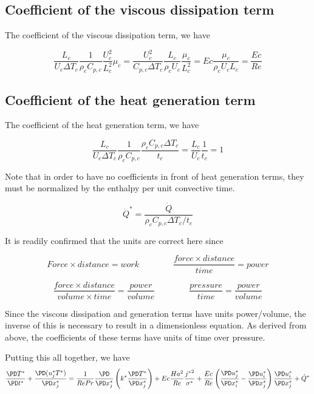 \documentclass[11pt]{article}
\begin{document}
\subsection{Coefficient of the viscous dissipation term}
The coefficient of the viscous dissipation term, we have

\begin{equation}
\frac{L_c}{U_c \Delta T_c} \frac{1}{\rho_c C_{p,c}} \frac{U_c^2}{L_c^2}\mu_c =
\frac{U_c^2}{C_{p,c} \Delta T_c} \frac{L_c}{\rho_c U_c} \frac{\mu_c}{L_c^2} =
Ec \frac{\mu_c}{\rho_c U_c L_c} =
\frac{Ec}{Re}
\end{equation}

\subsection{Coefficient of the heat generation term}
The coefficient of the heat generation term, we have

\begin{equation}
	\frac{L_c}{U_c \Delta T_c} \frac{1}{\rho_c C_{p,c}} \frac{\rho_c C_{p,c} \Delta T_c}{t_c} =
	\frac{L_c}{U_c} \frac{1}{t_c} = 1
\end{equation}

Note that in order to have no coefficients in front of heat generation terms, they must be normalized by the enthalpy per unit convective time.

\begin{equation}
\dot{Q}^* = \frac{\dot{Q}}{\rho_c C_{p,c} \Delta T_c / t_c}
\end{equation}

It is readily confirmed that the units are correct here since

\begin{equation}
Force \times distance = work \qquad \qquad
\frac{force \times distance}{time} = power
\end{equation}

\begin{equation}
\frac{force \times distance}{volume \times time} = \frac{power}{volume} \qquad \qquad
\frac{pressure}{time} = \frac{power}{volume}
\end{equation}

Since the viscous dissipation and generation terms have units power/volume, the inverse of this is necessary to result in a dimensionless equation. As derived from above, the coefficients of these terms have units of time over pressure.

Putting this all together, we have
\begin{equation}
	\frac{\PD T^*}{\PD t^*} + \frac{\PD (u_j^* T^*)}{\PD x_j^*}
	=
	\frac{1}{Re Pr}
	\frac{\PD}{\PD x_j^*}
	\left( k^* \frac{\PD T^*}{\PD x_j^*} \right) +
	Ec \frac{Ha^2}{Re}
	\frac{{j^*}^2}{\sigma^*} +
	\frac{Ec}{Re}
	\left( \frac{\PD u_j^*}{\PD x_i^*} - \frac{\PD u_i^*}{\PD x_j^*} \right)
	\frac{\PD u_i^*}{\PD x_j^*} +
	\dot{Q}^*
\end{equation}
\end{document}
